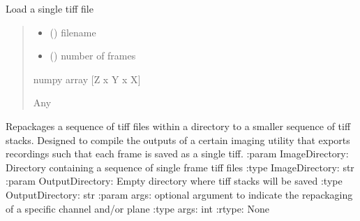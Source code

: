 \documentclass[letterpaper,10pt,english]{sphinxmanual}
\begin{document}
\begin{fulllineitems}
\label{\detokenize{IO:IO.load_single_tiff}}
\pysigstartsignatures
{}
\pysigstopsignatures
\sphinxAtStartPar
Load a single tiff file
\begin{quote}\begin{description}
\begin{itemize}
\item {} 
\sphinxAtStartPar
{} () \textendash{} filename

\item {} 
\sphinxAtStartPar
{} () \textendash{} number of frames

\end{itemize}

\sphinxAtStartPar
numpy array {[}Z x Y x X{]}

\sphinxAtStartPar
Any

\end{description}\end{quote}

\end{fulllineitems}


\begin{fulllineitems}
\label{\detokenize{IO:IO.repackage_bruker_tiffs}}
\pysigstartsignatures
{}
\pysigstopsignatures
\sphinxAtStartPar
Repackages a sequence of tiff files within a directory to a smaller sequence
of tiff stacks.
Designed to compile the outputs of a certain imaging utility
that exports recordings such that each frame is saved as a single tiff.
:param ImageDirectory: Directory containing a sequence of single frame tiff files
:type ImageDirectory: str
:param OutputDirectory: Empty directory where tiff stacks will be saved
:type OutputDirectory: str
:param args: optional argument to indicate the repackaging of a specific channel and/or plane
:type args: int
:rtype: None

\end{fulllineitems}
\end{document}
